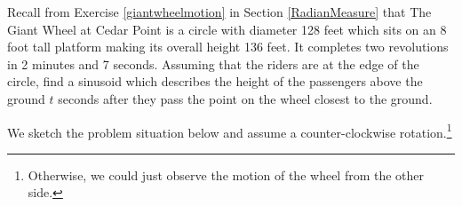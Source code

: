 \documentclass{ximera}
\begin{document}
\begin{example} \label{ycoordonwheel} Recall from Exercise \ref{giantwheelmotion} in Section \ref{RadianMeasure} that The Giant Wheel at Cedar Point is a circle with diameter 128 feet which sits on an 8 foot tall platform making its overall height 136 feet.   It completes two revolutions in 2 minutes and 7 seconds.  Assuming that the riders are at the edge of the circle, find a sinusoid which describes the height of the passengers above the ground  $t$ seconds after they pass the point on the wheel closest to the ground.

\begin{explanation}  We sketch the problem situation below and assume a counter-clockwise rotation.\footnote{Otherwise, we could just observe the motion of the wheel from the other side.} 

\begin{image}
\end{image}
\end{explanation}
\end{example}
\end{document}
